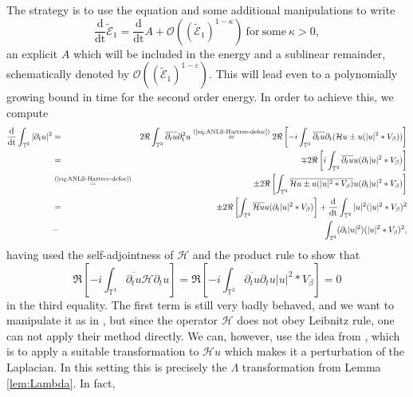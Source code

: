 The strategy is to use the equation and some additional manipulations to write
\begin{equation}
  \frac{\mathrm{d}}{\mathrm{dt}} \tilde{\mathcal{E}}_1 = \frac{\mathrm{d}}{\mathrm{dt}} A + \mathcal{O}
  ((\tilde{\mathcal{E}}_1)^{1 - \kappa}) \ \mathrm{for \ some} \ \kappa > 0,
  \label{formal:E1}
\end{equation}
an explicit $A$ which will be included in the energy and a sublinear
remainder, schematically denoted by $\mathcal{O}((\tilde{\mathcal{E}}_1)^{1 -
\varepsilon})$. This will lead even to a polynomially growing bound in time
for the second order energy. In order to achieve this, we compute
\begin{eqnarray*}
  \frac{\mathrm{d}}{\mathrm{dt}} \int_{\mathbb{T}^3} | \partial_t u |^2 & = & 2 \Re
  \int_{\mathbb{T}^3} \overline{\partial_t u} \partial^2_t u
  \overset{\text{(\ref{eq:ANLS-Hartree-defoc})}}{=} 2 \Re \left[ - i
  \int_{\mathbb{T}^3} \overline{\partial_t u} \partial_t (\mathcal{H} u \pm u
  (| u |^2 \ast V_{\beta})) \right]\\
  & = & \mp 2 \Re \left[ i \int_{\mathbb{T}^3} \overline{\partial_t u} u
  (\partial_t | u |^2 \ast V_{\beta}) \right]\\
  &\overset{\text{(\ref{eq:ANLS-Hartree-defoc})}}{=}& \pm 2 \Re \left[
  \int_{\mathbb{T}^3} \overline{\mathcal{H} u \pm u (| u |^2 \ast V_{\beta})}
  u (\partial_t | u |^2 \ast V_{\beta}) \right]\\
  & = & \pm 2 \Re \left[ \int_{\mathbb{T}^3} \overline{\mathcal{H} u} u
  (\partial_t | u |^2 \ast V_{\beta}) \right] + \frac{\mathrm{d}}{\mathrm{dt}}
  \int_{\mathbb{T}^3} | u |^2 (| u |^2 \ast V_{\beta})^2\\
  &-& \int_{\mathbb{T}^3}
  (\partial_t | u |^2) (| u |^2 \ast V_{\beta})^2,
\end{eqnarray*}
having used the self-adjointness of $\mathcal{H}$ and the product rule to show
that
\[ \Re \left[ - i \int_{\mathbb{T}^3} \overline{\partial_t u} \mathcal{H}
   \partial_t u \right] = \Re \left[ - i \int_{\mathbb{T}^3}
   \overline{\partial_t u} \partial_t u | u |^2 \ast V_{\beta} \right] = 0 \]
in the third equality. The first term is still very badly behaved, and we want to manipulate it as
in {\cite{PTV17}}, but since the operator $\mathcal{H}$ does not obey Leibnitz
rule, one can not apply their method directly. We can, however, use the idea
from {\cite{Z19}}, which is to apply a suitable transformation to $\mathcal{H}
u$ which makes it a perturbation of the Laplacian. In this setting this is
precisely the $\Lambda$ transformation from Lemma \ref{lem:Lambda}. In fact,
